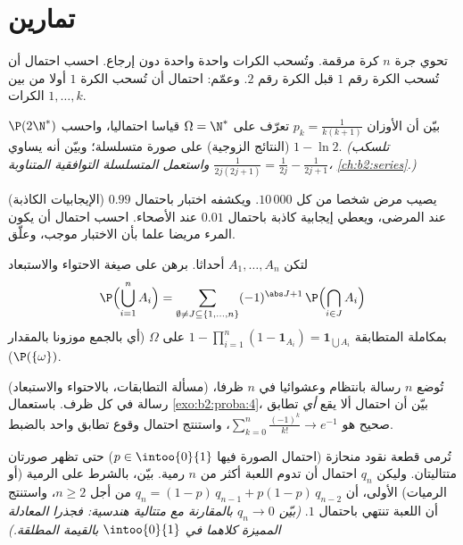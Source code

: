\section{تمارين}

\begin{exercise}[$\star$]\label{exo:b2:proba:1}
تحوي جرة $n$ كرة مرقمة. وتُسحب الكرات واحدة واحدة دون إرجاع.
احسب احتمال أن تُسحب الكرة رقم $1$ قبل الكرة رقم $2$. وعمّم:
احتمال أن تُسحب الكرة $1$ أولا من بين الكرات $1, \dots, k$.
\end{exercise}

\begin{exercise}[$\star$]\label{exo:b2:proba:2}
بيّن أن الأوزان $p_k = \frac{1}{k(k+1)}$ تعرّف على $\Omega = \N^*$ قياسا احتماليا، واحسب $\P(2\N^*)$
(النتائج الزوجية) على صورة متسلسلة؛ وبيّن أنه يساوي $1 - \ln 2$.
\emph{(تلسكب $\frac{1}{2j(2j+1)} = \frac{1}{2j} -
\frac{1}{2j+1}$ واستعمل المتسلسلة التوافقية المتناوبة، \cref{ch:b2:series}.)}
\end{exercise}

\begin{exercise}[$\star$]\label{exo:b2:proba:3}
(الإيجابيات الكاذبة) يصيب مرض شخصا من كل $10\,000$. ويكشفه اختبار
باحتمال $0.99$ عند المرضى، ويعطي إيجابية كاذبة باحتمال $0.01$ عند
الأصحاء. احسب احتمال أن يكون المرء مريضا علما بأن الاختبار موجب،
وعلّق.
\end{exercise}

\begin{exercise}[$\star\star$]\label{exo:b2:proba:4}
لتكن $A_1, \dots, A_n$ أحداثا. برهن على صيغة الاحتواء والاستبعاد
\[
\P\Bigl(\bigcup_{i=1}^n A_i\Bigr)
= \sum_{\emptyset \neq J \subseteq \{1,\dots,n\}}
(-1)^{\abs J + 1}\,\P\Bigl(\bigcap_{i \in J}A_i\Bigr)
\]
بمكاملة المتطابقة $1 - \prod_{i=1}^n(1 -
\mathbf{1}_{A_i}) = \mathbf{1}_{\bigcup A_i}$ على $\Omega$ (أي بالجمع موزونا بالمقدار
$\P(\{\omega\})$).
\end{exercise}

\begin{exercise}[$\star\star$]\label{exo:b2:proba:5}
(مسألة التطابقات، بالاحتواء والاستبعاد) تُوضع $n$ رسالة بانتظام
وعشوائيا في $n$ ظرفا، رسالة في كل ظرف. باستعمال \cref{exo:b2:proba:4}، بيّن أن
احتمال ألا يقع \emph{أي} تطابق صحيح هو $\sum_{k=0}^n \frac{(-1)^k}{k!} \to e^{-1}$، واستنتج احتمال وقوع
تطابق واحد بالضبط.
\end{exercise}

\begin{exercise}[$\star\star$]\label{exo:b2:proba:6}
تُرمى قطعة نقود منحازة (احتمال الصورة فيها $p \in \intoo{0}{1}$) حتى تظهر صورتان
متتاليتان. وليكن $q_n$ احتمال أن تدوم اللعبة أكثر من $n$ رمية.
بيّن، بالشرط على الرمية (أو الرميات) الأولى، أن $q_n = (1-p)\,q_{n-1} + p(1-p)\,q_{n-2}$ من أجل $n \geq 2$،
واستنتج أن اللعبة تنتهي باحتمال $1$. \emph{(بيّن $q_n \to 0$ بالمقارنة
مع متتالية هندسية: فجذرا المعادلة المميزة كلاهما في $\intoo{0}{1}$ بالقيمة
المطلقة.)}
\end{exercise}

